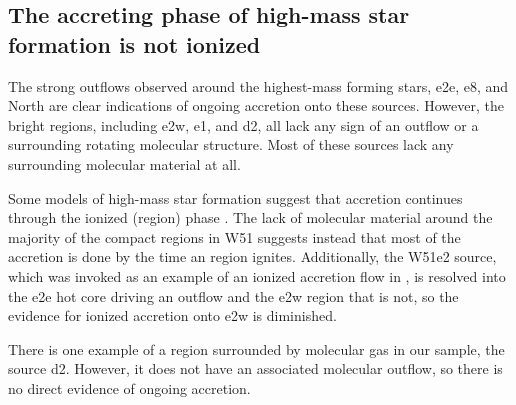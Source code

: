 \documentclass{emulateapj}
\begin{document}
\subsection{The accreting phase of high-mass star formation is not ionized}
\label{sec:accretionandoutflows}
The strong outflows observed around the highest-mass forming stars, e2e, e8,
and North are clear indications of ongoing accretion onto these sources.
However, the bright \hii regions, including e2w, e1, and d2, all lack any sign
of an outflow or a surrounding rotating molecular structure.  Most of these
sources lack any surrounding molecular material at all.

Some models of high-mass star formation suggest that accretion continues
through the ionized (\hii region) phase \citep{Keto2002b,Keto2003}.  The lack
of molecular material around the majority of the compact \hii regions in W51
suggests instead that most of the accretion is done by the time an \hii region
ignites.  Additionally, the W51e2 source, which was invoked as an example of an
ionized accretion flow in \citet{Keto2008a}, is  resolved into the e2e
hot core driving an outflow and the e2w \hchii region that is not, so the
evidence for ionized accretion onto e2w is diminished.

There is one example of a \hchii region surrounded by molecular gas in our
sample, the source d2.  However, it does not have an associated molecular
outflow, so there is no direct evidence of ongoing accretion.

% 
\end{document}
